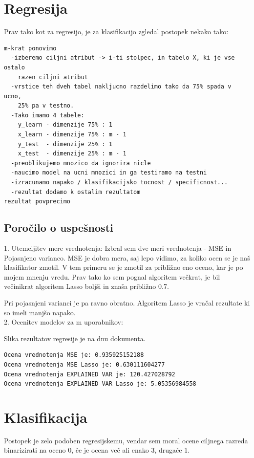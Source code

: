 \documentclass[a4paper,11pt]{article}
\begin{document}
	\section{Regresija}
	Prav tako kot za regresijo, je za klasifikacijo zgledal postopek nekako tako:
\begin{lstlisting}
m-krat ponovimo
  -izberemo ciljni atribut -> i-ti stolpec, in tabelo X, ki je vse ostalo
    razen ciljni atribut
  -vrstice teh dveh tabel nakljucno razdelimo tako da 75% spada v ucno,
    25% pa v testno.
  -Tako imamo 4 tabele:
    y_learn - dimenzije 75% : 1
    x_learn - dimenzije 75% : m - 1
    y_test  - dimenzije 25% : 1
    x_test  - dimenzije 25% : m - 1
  -preoblikujemo mnozico da ignorira nicle
  -naucimo model na ucni mnozici in ga testiramo na testni
  -izracunamo napako / klasifikacijsko tocnost / specificnost...
  -rezultat dodamo k ostalim rezultatom
rezultat povprecimo

\end{lstlisting}
	\subsection{Poročilo o uspešnosti}
	1. Utemeljitev mere vrednotenja:
		Izbral sem dve meri vrednotenja - MSE in Pojasnjeno varianco. MSE je dobra mera, saj lepo
		vidimo, za koliko ocen se je naš klasifikator zmotil. V tem primeru se je zmotil za približno eno
		oceno, kar je po mojem mnenju vredu.
		Prav tako ko sem pognal algoritem večkrat, je bil večinikrat algoritem Lasso boljši in znaša približno 0.7.
		
		Pri pojasnjeni varianci je pa ravno obratno. Algoritem Lasso je vračal rezultate ki so imeli manjšo napako.\\
	2. Ocenitev modelov za m uporabnikov:
		
Slika rezultatov regresije je na dnu dokumenta.

	
\begin{lstlisting}
Ocena vrednotenja MSE je: 0.935925152188
Ocena vrednotenja MSE Lasso je: 0.630111604277
Ocena vrednotenja EXPLAINED VAR je: 120.427028792
Ocena vrednotenja EXPLAINED VAR Lasso je: 5.05356984558
\end{lstlisting}	


	
	\section{Klasifikacija}
	Postopek je zelo podoben regresijskemu, vendar sem moral ocene ciljnega razreda binarizirati na oceno 0, če je ocena več ali enako 3, drugače 1.
	
\end{document}
